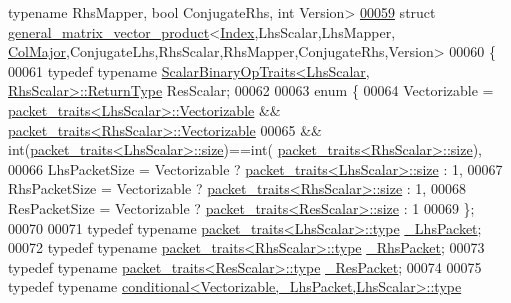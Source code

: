\begin{DoxyCode}
{      typename} RhsMapper, \textcolor{keywordtype}{bool} ConjugateRhs, \textcolor{keywordtype}{int} Version>
\hyperlink{struct_eigen_1_1internal_1_1general__matrix__vector__product_3_01_index_00_01_lhs_scalar_00_01_l2767aff966c7bf3a7d425c9d340a95e8}{00059} \textcolor{keyword}{struct }\hyperlink{struct_eigen_1_1internal_1_1general__matrix__vector__product}{general\_matrix\_vector\_product}<\hyperlink{namespace_eigen_a62e77e0933482dafde8fe197d9a2cfde}{Index},LhsScalar,LhsMapper,
      \hyperlink{group__enums_ggaacded1a18ae58b0f554751f6cdf9eb13a0cbd4bdd0abcfc0224c5fcb5e4f6669a}{ColMajor},ConjugateLhs,RhsScalar,RhsMapper,ConjugateRhs,Version>
00060 \{
00061   \textcolor{keyword}{typedef} \textcolor{keyword}{typename} \hyperlink{group___core___module_struct_eigen_1_1_scalar_binary_op_traits}{ScalarBinaryOpTraits<LhsScalar, RhsScalar>::ReturnType}
       ResScalar;
00062 
00063 \textcolor{keyword}{enum} \{
00064   Vectorizable = \hyperlink{struct_eigen_1_1internal_1_1packet__traits}{packet\_traits<LhsScalar>::Vectorizable} && 
      \hyperlink{struct_eigen_1_1internal_1_1packet__traits}{packet\_traits<RhsScalar>::Vectorizable}
00065               && int(\hyperlink{struct_eigen_1_1internal_1_1packet__traits}{packet\_traits<LhsScalar>::size})==int(
      \hyperlink{struct_eigen_1_1internal_1_1packet__traits}{packet\_traits<RhsScalar>::size}),
00066   LhsPacketSize = Vectorizable ? \hyperlink{struct_eigen_1_1internal_1_1packet__traits}{packet\_traits<LhsScalar>::size} : 1,
00067   RhsPacketSize = Vectorizable ? \hyperlink{struct_eigen_1_1internal_1_1packet__traits}{packet\_traits<RhsScalar>::size} : 1,
00068   ResPacketSize = Vectorizable ? \hyperlink{struct_eigen_1_1internal_1_1packet__traits}{packet\_traits<ResScalar>::size} : 1
00069 \};
00070 
00071 \textcolor{keyword}{typedef} \textcolor{keyword}{typename} \hyperlink{group___sparse_core___module}{packet\_traits<LhsScalar>::type}  
      \hyperlink{group___sparse_core___module}{\_LhsPacket};
00072 \textcolor{keyword}{typedef} \textcolor{keyword}{typename} \hyperlink{group___sparse_core___module}{packet\_traits<RhsScalar>::type}  
      \hyperlink{group___sparse_core___module}{\_RhsPacket};
00073 \textcolor{keyword}{typedef} \textcolor{keyword}{typename} \hyperlink{group___sparse_core___module}{packet\_traits<ResScalar>::type}  
      \hyperlink{group___sparse_core___module}{\_ResPacket};
00074 
00075 \textcolor{keyword}{typedef} \textcolor{keyword}{typename} \hyperlink{class_eigen_1_1internal_1_1_tensor_lazy_evaluator_writable}{conditional<Vectorizable,\_LhsPacket,LhsScalar>::type}

\end{DoxyCode}
